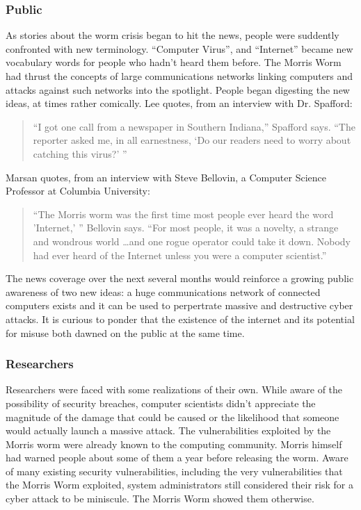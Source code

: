 \subsubsection*{Public}
As stories about the worm crisis began to hit the news, people were suddently
confronted with new terminology. ``Computer Virus'', and ``Internet'' became
new vocabulary words for people who hadn't heard them before. The Morris
Worm had thrust the concepts of large communications networks linking computers
and attacks against such networks into the spotlight. People began digesting the
new ideas, at times rather comically.
Lee\cite{lee_washpost_2013} quotes, from an
interview with Dr. Spafford:
\begin{quote}
``I got one call from a newspaper in Southern Indiana,'' Spafford says. ``The
reporter asked me, in all earnestness, `Do our readers need to worry about
catching this virus?' ''
\end{quote}
Marsan\cite{marsan_morris_2008} quotes, from an
interview with Steve Bellovin, a Computer Science Professor at Columbia
University:
\begin{quote}
``The Morris worm was the first time most people ever heard the word 'Internet,'
'' Bellovin says. ``For most people, it was a novelty, a strange and wondrous
world \ldots and one rogue operator could take it down. Nobody had ever heard
of the Internet unless you were a computer scientist.''
\end{quote}
The news coverage over the next several months would reinforce a growing public
awareness of two new ideas: a huge communications network of connected
computers exists and it can be used to perpertrate massive and destructive
cyber attacks.
It is curious to ponder that the existence of the internet and its
potential for misuse both dawned on the public at the same time.
           	
\subsubsection*{Researchers}
Researchers were faced with some realizations of their own. While aware of the
possibility of security breaches, computer scientists didn't appreciate the
magnitude of the damage that could be caused or the likelihood that someone
would actually launch a massive attack. The vulnerabilities exploited by the
Morris worm were already known to the computing community. Morris himself
had warned people about some of them\cite{spafford_internet_1989} a year before
releasing the worm. Aware of many
existing security vulnerabilities, including the very vulnerabilities that
the Morris Worm exploited, system administrators still considered their risk
for a cyber attack to be miniscule. The Morris Worm showed them otherwise. 

